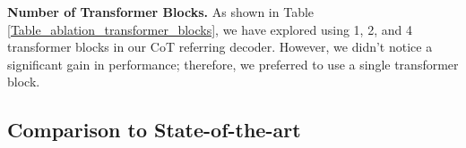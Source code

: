 \noindent \textbf{Number of Transformer Blocks.}
As shown in Table \ref{Table_ablation_transformer_blocks}, we have explored using 1, 2, and 4 transformer blocks in our CoT referring decoder. 
However, we didn't notice a significant gain in performance; therefore, we preferred to use a single transformer block.
\subsection{Comparison to State-of-the-art}

\tabcolsep=0.1cm
\begin{table}
\vspace{-8mm}
\captionsetup{font=small}
\centering
\caption{Benchmarking results on Nr3D and Sr3D datasets \citep{achlioptas2020referit3d}. We emphasize that we did not require any additional GT annotations, in contrast to SAT \citep{yang2021sat} which requires access to real 2D images, and PhraseRefer \citep{yuan2022toward} and ScanEnts \citep{abdelreheem2022scanents3d} require manual annotations for the whole anchors in the data. We report the standard-deviation $\sigma$ in green.}
\end{table}
